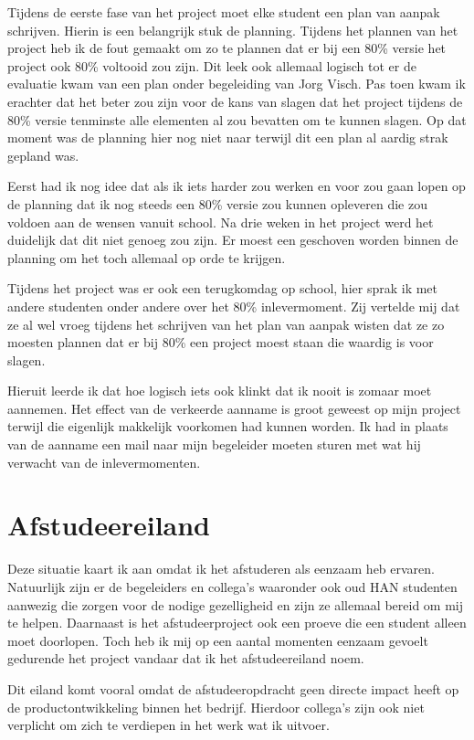\documentclass[a4paper, 11pt, oneside]{report}
\begin{document}
Tijdens de eerste fase van het project moet elke student een plan van aanpak schrijven. Hierin is een belangrijk stuk de planning. Tijdens het plannen van het project heb ik de fout gemaakt om zo te plannen dat er bij een 80\% versie het project ook 80\% voltooid zou zijn. Dit leek ook allemaal logisch tot er de evaluatie kwam van een plan onder begeleiding van Jorg Visch. Pas toen kwam ik erachter dat het beter zou zijn voor de kans van slagen dat het project tijdens de 80\% versie tenminste alle elementen al zou bevatten om te kunnen slagen. 
Op dat moment was de planning hier nog niet naar terwijl dit een plan al aardig strak gepland was.

Eerst had ik nog idee dat als ik iets harder zou werken en voor zou gaan lopen op de planning dat ik nog steeds een 80\% versie zou kunnen opleveren die zou voldoen aan de wensen vanuit school. Na drie weken in het project werd het duidelijk dat dit niet genoeg zou zijn. Er moest een geschoven worden binnen de planning om het toch allemaal op orde te krijgen.

Tijdens het project was er ook een terugkomdag op school, hier sprak ik met andere studenten onder andere over het 80\% inlevermoment. Zij vertelde mij dat ze al wel vroeg tijdens het schrijven van het plan van aanpak wisten dat ze zo moesten plannen dat er bij 80\% een project moest staan die waardig is voor slagen.

Hieruit leerde ik dat hoe logisch iets ook klinkt dat ik nooit is zomaar moet aannemen. Het effect van de verkeerde aanname is groot geweest op mijn project terwijl die eigenlijk makkelijk voorkomen had kunnen worden. Ik had in plaats van de aanname een mail naar mijn begeleider moeten sturen met wat hij verwacht van de inlevermomenten.  
  


\section{Afstudeereiland}
Deze situatie kaart ik aan omdat ik het afstuderen als eenzaam heb ervaren.
Natuurlijk zijn er de begeleiders en collega's waaronder ook oud HAN studenten aanwezig die zorgen voor de nodige gezelligheid en zijn ze allemaal bereid om mij te helpen.
Daarnaast is het afstudeerproject ook een proeve die een student alleen moet doorlopen.
Toch heb ik mij op een aantal momenten eenzaam gevoelt gedurende het project vandaar dat ik het afstudeereiland noem.

Dit eiland komt vooral omdat de afstudeeropdracht geen directe impact heeft op de productontwikkeling binnen het bedrijf. Hierdoor collega's zijn ook niet verplicht om zich te verdiepen in het werk wat ik uitvoer. 
\end{document}
